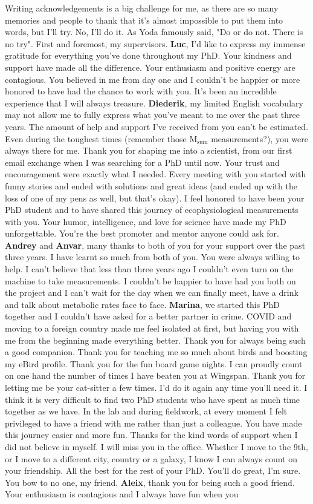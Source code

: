 \documentclass[10pt, twoside]{book} %
\begin{document}
		Writing acknowledgements is a big challenge for me, as there are so many memories and people to thank that it's almost impossible to put them into words, but I'll try. No, I'll do it. As Yoda famously said, "Do or do not. There is no try". First and foremost, my supervisors. \textbf{Luc}, I'd like to express my immense gratitude for everything you've done throughout my PhD. Your kindness and support have made all the difference. Your enthusiasm and positive energy are contagious. You believed in me from day one and I couldn't be happier or more honored to have had the chance to work with you. It's been an incredible experience that I will always treasure. \textbf{Diederik}, my limited English vocabulary may not allow me to fully express what you've meant to me over the past three years. The amount of help and support I've received from you can't be estimated. Even during the toughest times (remember those M$_{\text{sum}}$ measurements?), you were always there for me. Thank you for shaping me into a scientist, from our first email exchange when I was searching for a PhD until now. Your trust and encouragement were exactly what I needed. Every meeting with you started with funny stories and ended with solutions and great ideas (and ended up with the loss of one of my pens as well, but that's okay). I feel honored to have been your PhD student and to have shared this journey of ecophysiological measurements with you. Your humor, intelligence, and love for science have made my PhD unforgettable. You're the best promoter and mentor anyone could ask for. \textbf{Andrey} and \textbf{Anvar}, many thanks to both of you for your support over the past three years. I have learnt so much from both of you. You were always willing to help. I can't believe that less than three years ago I couldn't even turn on the machine to take measurements. I couldn't be happier to have had you both on the project and I can't wait for the day when we can finally meet, have a drink and talk about metabolic rates face to face. \textbf{Marina}, we started this PhD together and I couldn't have asked for a better partner in crime. COVID and moving to a foreign country made me feel isolated at first, but having you with me from the beginning made everything better. Thank you for always being such a good companion. Thank you for teaching me so much about birds and boosting my eBird profile. Thank you for the fun board game nights. I can proudly count on one hand the number of times I have beaten you at Wingspan. Thank you for letting me be your cat-sitter a few times. I'd do it again any time you’ll need it. I think it is very difficult to find two PhD students who have spent as much time together as we have. In the lab and during fieldwork, at every moment I felt privileged to have a friend with me rather than just a colleague. You have made this journey easier and more fun. Thanks for the kind words of support when I did not believe in myself. I will miss you in the office. Whether I move to the 9th, or I move to a different city, country or a galaxy, I know I can always count on your friendship. All the best for the rest of your PhD. You’ll do great, I’m sure. You bow to no one, my friend. \textbf{Aleix}, thank you for being such a good friend. Your enthusiasm is contagious and I always have fun when you 
\end{document}
